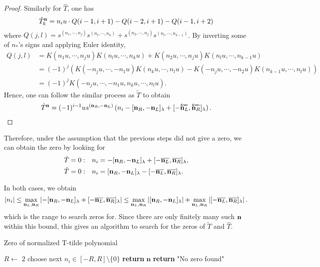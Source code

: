 \documentclass{article}
\theoremstyle{definition}
\theoremstyle{plain}
\theoremstyle{remark}
\numberwithin{equation}{section}
\newcommand{\abs}[1]{\left\lvert{#1}\right\rvert}
\begin{document}
\begin{proof}
  Similarly for $\hat{T}$, one has
  \[
    \hat{T}_k^{\mathbf{n}} = n_i u \cdot Q(i-1, i+1) - Q(i-2, i+1) - Q(i-1, i+2)
  \]
  where $Q(j, l) = s^{(n_1, \cdots, n_j)} s^{(n_l, \cdots, n_k)} + s^{(n_2, \cdots, n_j)} s^{(n_l, \cdots, n_{k-1})}$.
  By inverting some of $n_*$'s signs and applying Euler identity,
  \begin{align*}
    Q(j, l) & = K(n_1 u, \cdots, n_j u) K(n_l u, \cdots, n_k u) + K(n_2 u, \cdots, n_j u) K(n_l u, \cdots, n_{k-1} u) \\
    & = (-1)^j ( K(- n_j u, \cdots, - n_1 u) K(n_k u, \cdots, n_l u) - K(-n_j u, \cdots, -n_2 u) K(n_{k-1} u, \cdots, n_l u) ) \\
    & = (-1)^j K(- n_j u, \cdots, - n_1 u, n_k u, \cdots, n_l u).
  \end{align*}
  Hence, one can follow the similar process as $\tilde{T}$ to obtain
  \begin{align*}
    \hat{T}^{\mathbf{n}} = (-1)^{i-1} u s^{(\mathbf{n}_R, -\mathbf{n}_L)}
    \left( n_i - [\mathbf{n}_R, -\mathbf{n}_L]_\lambda + [-\overleftarrow{\mathbf{n}_L}, \overleftarrow{\mathbf{n}_R}]_\lambda \right).
  \end{align*}
\end{proof}

Therefore, under the assumption that the previous steps did not give a zero,
we can obtain the zero by looking for
\begin{align*}
  \tilde{T} = 0: &
  \quad n_i = - [\mathbf{n}_R, -\mathbf{n}_L]_\lambda + [- \overline{\mathbf{n}_L}, \overline{\mathbf{n}_R}]_\lambda, \\
  \hat{T} = 0: &
  \quad n_i = [\mathbf{n}_R, -\mathbf{n}_L]_\lambda - [- \overline{\mathbf{n}_L}, \overline{\mathbf{n}_R}]_\lambda.
\end{align*}

In both cases, we obtain
\[
  \abs{n_i}
  \leq \max_{\nsL, \nsR} \abs{- [\nsR, -\nsL]_\lambda + [- \overline{\nsL}, \overline{\nsR}]_\lambda}
  \leq \max_{\nsL, \nsR} \abs{[\nsR, -\nsL]_\lambda} + \max_{\nsL, \nsR} \abs{[- \overline{\nsL}, \overline{\nsR}]_\lambda}.
\]
which is the range to search zeros for.
Since there are only finitely many such $\mathbf{n}$ within this bound,
this gives an algorithm to search for the zeros of $\tilde{T}$ and $\hat{T}$.

\begin{algorithm}
  \caption{Zero of normalized T-tilde polynomial}
  \begin{algorithmic}
    \EndFunction

          \State $R \gets$ $2$ 
          \State choose next $n_i \in [- R, R] \setminus \{0\}$
        \EndFor
          \State \textbf{return} $\mathbf{n}$
        \EndIf
      \EndWhile
      \State \textbf{return} "No zero found"
    \EndFunction
  \end{algorithmic}
\end{algorithm}
\end{document}

